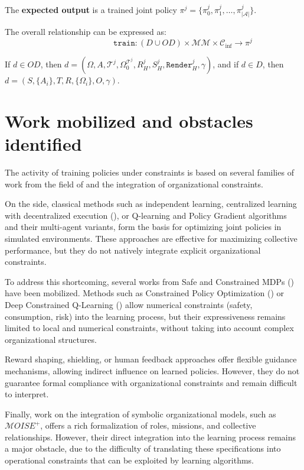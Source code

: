 \noindent
The \textbf{expected output} is a trained joint policy $\pi^j = \{\pi^j_0, \pi^j_1, \dots, \pi^j_{|\mathcal{A}|}\}$.

\medskip
\noindent

\noindent The overall relationship can be expressed as:
\begin{displaymath}
  \hspace{3cm}\texttt{train}: (D \cup OD) \times \mathcal{MM} \times \mathcal{C}_{\text{inf}} \rightarrow \pi^j
\end{displaymath}

If $d \in OD$, then $d = (\Omega, A, \mathcal{T}^j, \Omega^{\mathcal{T}^j}_0, R^j_H, S^j_H, \texttt{Render}^j_H, \gamma)$, and if $d \in D$, then $d = (S,\{A_i\},T,R,\{\Omega_i\}, \allowbreak O,\gamma)$.

\section{Work mobilized and obstacles identified}

The activity of training policies under constraints is based on several families of work from the field of  and the integration of organizational constraints.

On the  side, classical methods such as independent learning, centralized learning with decentralized execution (), or Q-learning and Policy Gradient algorithms and their multi-agent variants, form the basis for optimizing joint policies in simulated environments. These approaches are effective for maximizing collective performance, but they do not natively integrate explicit organizational constraints.

To address this shortcoming, several works from Safe  and Constrained MDPs () have been mobilized. Methods such as Constrained Policy Optimization () or Deep Constrained Q-Learning () allow numerical constraints (safety, consumption, risk) into the learning process, but their expressiveness remains limited to local and numerical constraints, without taking into account complex organizational structures.

Reward shaping, shielding, or human feedback approaches offer flexible guidance mechanisms, allowing indirect influence on learned policies. However, they do not guarantee formal compliance with organizational constraints and remain difficult to interpret.

Finally, work on the integration of symbolic organizational models, such as $\mathcal{M}OISE^+$, offers a rich formalization of roles, missions, and collective relationships. However, their direct integration into the  learning process remains a major obstacle, due to the difficulty of translating these specifications into operational constraints that can be exploited by learning algorithms.

